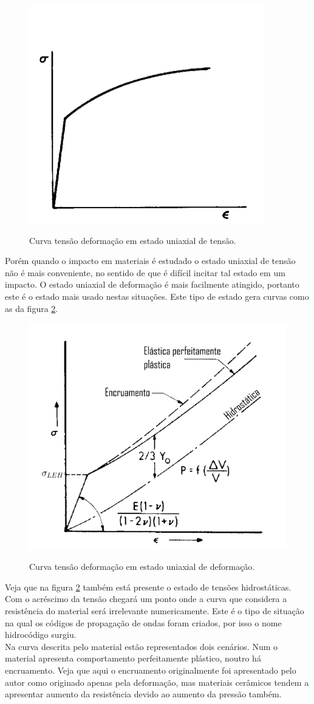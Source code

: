  \begin{figure}[H]
     \centering
     \caption{Curva tensão deformação em estado uniaxial de tensão.}
     \includegraphics[width=0.5\linewidth]{images/tensuniaxial.png}
     \label{fig:tensuniaxi}
 \end{figure}
 
 Porém quando o impacto em materiais é estudado o estado uniaxial de tensão não é mais conveniente, no sentido de que é difícil incitar tal estado em um impacto. O estado uniaxial de deformação é mais facilmente atingido, portanto este é o estado mais usado nestas situações. Este tipo de estado gera curvas como as da figura \ref{fig:defuniaxi}.
 
 \begin{figure}[H]
     \centering
     \caption{Curva tensão deformação em estado uniaxial de deformação.}
     \includegraphics[width=0.5\linewidth]{images/defuniaxial.png}
     \label{fig:defuniaxi}
 \end{figure}
 
 Veja que na figura \ref{fig:defuniaxi} também está presente o estado de tensões hidrostáticas. Com o acréscimo da tensão chegará um ponto onde a curva que considera a resistência do material será irrelevante numericamente. Este é o tipo de situação na qual os códigos de propagação de ondas foram criados, por isso o nome hidrocódigo surgiu. \\
 Na curva descrita pelo material estão representados dois cenários. Num o material apresenta comportamento perfeitamente plástico, noutro há encruamento. Veja que aqui o encruamento originalmente foi apresentado pelo autor \cite{Zukas} como originado apenas pela deformação, mas materiais cerâmicos tendem a apresentar aumento da resistência devido ao aumento da pressão também. \\
 
